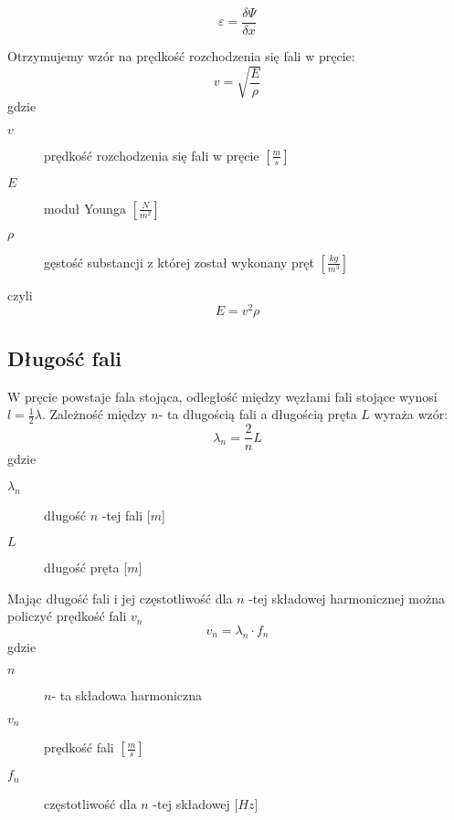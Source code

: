 \documentclass[a4paper,11pt]{article}
\begin{document}
 \begin{equation}
  \varepsilon = \frac{\delta \Psi}{\delta x}
 \end{equation}

\indent Otrzymujemy wzór na  prędkość rozchodzenia się fali w pręcie: 
\begin{equation}
 v = \sqrt{\frac{E}{\rho}} 
\end{equation}
gdzie 
\begin{description}
\item [$v$] prędkość rozchodzenia się fali w pręcie $\left[\frac{m}{s}\right]$
\item [$E$]  moduł Younga $\left[\frac{N}{m^2}\right]$
\item [$\rho$] gęstość substancji z której został wykonany pręt $\left[\frac{kg}{m^3}\right]$
\end{description}
czyli
\begin{equation}
\label{wzor:E}
E = v^2\rho 
\end{equation}

\subsection{Długość fali}

\indent W pręcie powstaje fala stojąca, odległość między węzłami fali stojące wynosi $ l = \frac{1}{2} \lambda $. Zależność między  $n$- ta długością fali a długością pręta $L$ wyraża wzór:
\begin{equation}
\label{wzor:lambda}
	\lambda_{n} = \frac{2}{n}L
\end{equation}
gdzie 
\begin{description}
\item [$\lambda_{n}$] długość $n$ -tej fali   [$m$]
\item [$L$] długość pręta [$m$]

\end{description}
Mając długość fali i jej częstotliwość dla $n$ -tej składowej harmonicznej można policzyć prędkość fali $v_{n}$
\begin{equation}
\label{wzor:v}
v_{n} = \lambda_{n} \cdot f_{n}
\end{equation}
gdzie
\begin{description}
\item [$n$] $n$- ta składowa harmoniczna
\item [$v_{n}$] prędkość fali $\left[\frac{m}{s}\right]$
\item [$f_{n}$] częstotliwość dla $n$ -tej składowej [$Hz$]
\end{description}
\end{document}
